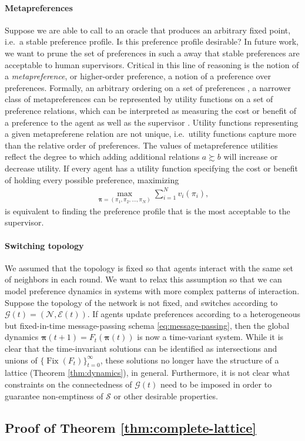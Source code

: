 \documentclass[conference]{ieeeconf}
\newcommand{\N}{\mathcal{N}}
\renewcommand{\SS}{\mathcal{S}}
\newcommand{\G}{\mathcal{G}}
\newcommand{\E}{\mathcal{E}}
\newcommand{\prefers}{\succsim}
\newcommand{\profile}{\boldsymbol{\pi}}
\DeclareMathOperator{\Fix}{Fix}
\begin{document}
\paragraph*{Metapreferences}
Suppose we are able to call to an oracle that produces an arbitrary fixed point, i.e.~a stable preference profile. Is this preference profile desirable? In future work, we want to prune the set of preferences in such a away that stable preferences are acceptable to human supervisors. Critical in this line of reasoning is the notion of a \emph{metapreference},  or higher-order preference, a notion of a preference over preferences. Formally, an arbitrary ordering on a set of preferences \cite{lutskanov2015}, a narrower class of metapreferences can be represented by utility functions on a set of preference relations, which can be interpreted as measuring the cost or benefit of a preference to the agent as well as the supervisor \cite{munger2019}. Utility functions representing a given metapreferene relation are not unique, i.e.~utility functions capture more than the relative order of preferences. The values of metapreference utilities reflect the degree to which adding additional relations $a \prefers b$ will increase or decrease utility. If every agent has a utility function specifying the cost or benefit of holding every possible preference, maximizing
\begin{align}
    \max_{\profile = (\pi_1,\pi_2,\dots,\pi_N)} \sum_{i=1}^N v_i(\pi_i), \label{eq:dist-opt}
\end{align}
is equivalent to finding the preference profile that is the most acceptable to the supervisor.



\paragraph*{Switching topology}
We assumed that the topology is fixed so that agents interact with the same set of neighbors in each round. We want to relax this assumption so that we can model preference dynamics in systems with more complex patterns of interaction. Suppose the topology of the network is not fixed, and switches according to $\G(t) = \left(\N, \E(t)\right)$. If agents update preferences according to a heterogeneous but fixed-in-time message-passing schema \eqref{eq:message-passing}, then the global dynamics $\profile(t+1) = F_t\left( \profile(t)\right)$ is now a time-variant system. While it is clear that the time-invariant solutions can be identified as intersections and unions of $\{\Fix(F_t)\}_{t = 0}^{\infty}$, these solutions no longer have the structure of a lattice (Theorem \ref{thm:dynamics}), in general. Furthermore, it is not clear what constraints on the connectedness of $\G(t)$ need to be imposed in order to guarantee  non-emptiness of $\SS$ or other desirable properties.




\appendix

\subsection*{Proof of Theorem \ref{thm:complete-lattice}}

\end{document}
